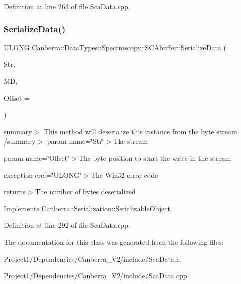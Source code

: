Definition at line 263 of file Sca\+Data.\+cpp.

\mbox{\label{class_canberra_1_1_data_types_1_1_spectroscopy_1_1_s_c_abuffer_a69ecf3e8a638642932466bd4f1dae471_a69ecf3e8a638642932466bd4f1dae471}} 
\subsubsection{\texorpdfstring{Serialize\+Data()}{SerializeData()}}
{\footnotesize\ttfamily U\+L\+O\+NG Canberra\+::\+Data\+Types\+::\+Spectroscopy\+::\+S\+C\+Abuffer\+::\+Serialize\+Data (\begin{DoxyParamCaption}\item[{\hyperlink{class_canberra_1_1_utility_1_1_core_1_1_byte_stream}{Canberra\+::\+Utility\+::\+Core\+::\+Byte\+Stream} \&}]{Str,  }\item[{const \hyperlink{class_canberra_1_1_serialization_1_1_meta_data}{Canberra\+::\+Serialization\+::\+Meta\+Data} \&}]{MD,  }\item[{const L\+O\+NG}]{Offset = {} }\end{DoxyParamCaption})\hspace{0.3cm}{\ttfamily [virtual]}}

summary$>$ This method will deserialize this instance from the byte stream /summary$>$ param name=\char`\"{}\+Str\char`\"{}$>$The stream

param name=\char`\"{}\+Offset\char`\"{}$>$The byte position to start the write in the stream

exception cref=\char`\"{}\+U\+L\+O\+N\+G\char`\"{}$>$The Win32 error code

returns$>$The number of bytes deserialized

Implements \hyperlink{class_canberra_1_1_serialization_1_1_serializable_object}{Canberra\+::\+Serialization\+::\+Serializable\+Object}.



Definition at line 292 of file Sca\+Data.\+cpp.



The documentation for this class was generated from the following files\+:\begin{DoxyCompactItemize}
\item 
Project1/\+Dependencies/\+Canberra\+\_\+\+V2/include/Sca\+Data.\+h\item 
Project1/\+Dependencies/\+Canberra\+\_\+\+V2/include/Sca\+Data.\+cpp\end{DoxyCompactItemize}
